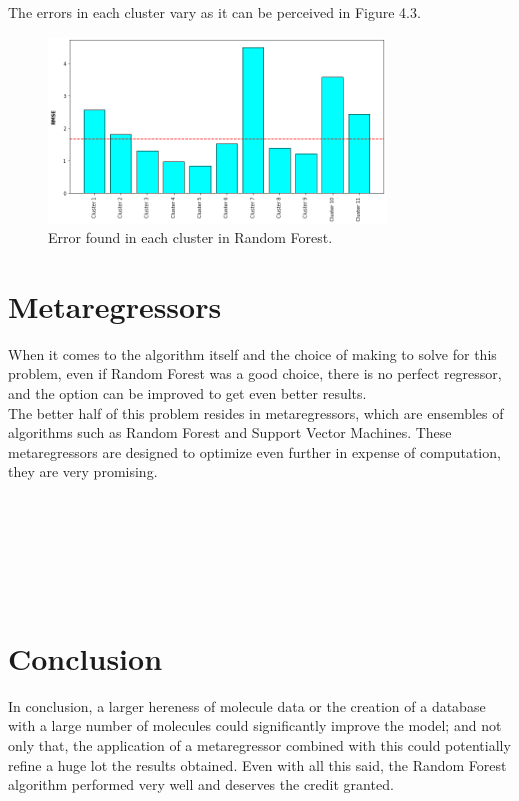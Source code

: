 The errors in each cluster vary as it can be perceived in Figure 4.3.
\begin{figure}[h]
    \centering
    \includegraphics[width=0.8\textwidth]{Images/Discussion/clustererror.png}
    \caption{Error found in each cluster in Random Forest.}
\end{figure}


\section*{Metaregressors}
When it comes to the algorithm itself and the choice of making to solve for this problem, even if Random Forest was a good choice, there is no perfect regressor, and the option can be improved to get even better results.\\

The better half of this problem resides in metaregressors, which are ensembles of algorithms such as Random Forest and Support Vector Machines. These metaregressors are designed to optimize even further in expense of computation, they are very promising.\\\\\\\\\\\\\\



\section*{Conclusion}
In conclusion, a larger hereness of molecule data or the creation of a database with a large number of molecules could significantly improve the model; and not only that, the application of a metaregressor combined with this could potentially refine a huge lot the results obtained. Even with all this said, the Random Forest algorithm performed very well and deserves the credit granted.